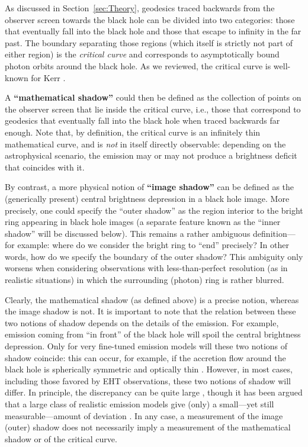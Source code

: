 \documentclass[graybox,envcountchap]{svmult}
\begin{document}
As discussed in Section~\ref{sec:Theory}, geodesics traced backwards from the observer screen towards the black hole can be divided into two categories: those that eventually fall into the black hole and those that escape to infinity in the far past.
The boundary separating those regions (which itself is strictly not part of either region) is the \emph{critical curve} and corresponds to asymptotically bound photon orbits around the black hole.
As we reviewed, the critical curve is well-known for Kerr \cite{Gralla2020,GrallaLupsasca2020c}.

A \textbf{``mathematical shadow''} could then be defined as the collection of points on the observer screen that lie inside the critical curve, i.e., those that correspond to geodesics that eventually fall into the black hole when traced backwards far enough.
Note that, by definition, the critical curve is an infinitely thin mathematical curve, and is \emph{not} in itself directly observable: depending on the astrophysical scenario, the emission may or may not produce a brightness deficit that coincides with it.

By contrast, a more physical notion of \textbf{``image shadow''} can be defined as the (generically present) central brightness depression in a black hole image.
More precisely, one could specify the ``outer shadow'' as the region interior to the bright ring appearing in black hole images (a separate feature known as the ``inner shadow'' \cite{Chael2021} will be discussed below).
This remains a rather ambiguous definition---for example: where do we consider the bright ring to ``end'' precisely?
In other words, how do we specify the boundary of the outer shadow?
This ambiguity only worsens when considering observations with less-than-perfect resolution (as in realistic situations) in which the surrounding (photon) ring is rather blurred.

Clearly, the mathematical shadow (as defined above) is a precise notion, whereas the image shadow is not.
It is important to note that the relation between these two notions of shadow depends on the details of the emission.
For example, emission coming from ``in front'' of the black hole will spoil the central brightness depression.
Only for very fine-tuned emission models will these two notions of shadow coincide: this can occur, for example, if the accretion flow around the black hole is spherically symmetric and optically thin \cite{Falcke2000,Narayan2019}.
However, in most cases, including those favored by EHT observations, these two notions of shadow will differ.
In principle, the discrepancy can be quite large \cite{Gralla2019}, though it has been argued that a large class of realistic emission models give (only) a small---yet still measurable---amount of deviation \cite{Bronzwaer2021}.
In any case, a measurement of the image (outer) shadow does not necessarily imply a measurement of the mathematical shadow or of the critical curve.
\end{document}
